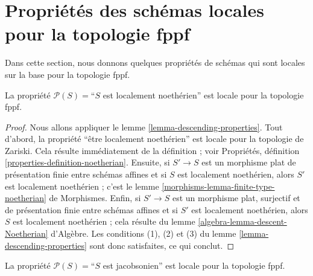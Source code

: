 \section{Propriétés des schémas locales pour la topologie fppf}
\label{section-descending-properties-fppf}

\noindent
Dans cette section, nous donnons quelques propriétés de schémas qui sont
locales sur la base pour la topologie fppf.

\begin{lemma}
\label{lemma-Noetherian-local-fppf}
La propriété $\mathcal{P}(S) =$``$S$ est localement noethérien'' est locale
pour la topologie fppf.
\end{lemma}

\begin{proof}
Nous allons appliquer le lemme \ref{lemma-descending-properties}.
Tout d'abord, la propriété ``être localement noethérien'' est locale pour la
topologie de Zariski. Cela résulte immédiatement de la définition ; voir
Propriétés, définition \ref{properties-definition-noetherian}.
Ensuite, si $S' \to S$ est un morphisme plat de présentation finie entre
schémas affines et si $S$ est localement noethérien, alors $S'$ est
localement noethérien ; c'est le lemme
\ref{morphisms-lemma-finite-type-noetherian} de Morphismes. Enfin, si $S' \to S$ est un
morphisme plat, surjectif et de présentation finie entre schémas affines et
si $S'$ est localement noethérien, alors $S$ est localement noethérien ; cela
résulte du lemme \ref{algebra-lemma-descent-Noetherian} d'Algèbre.
Les conditions (1), (2) et (3) du lemme
\ref{lemma-descending-properties} sont donc satisfaites, ce qui conclut.
\end{proof}

\begin{lemma}
\label{lemma-Jacobson-local-fppf}
La propriété $\mathcal{P}(S) =$``$S$ est jacobsonien'' est locale pour la
topologie fppf.
\end{lemma}

